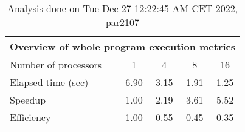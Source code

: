 \begin{table}[h]
\begin{center}
\begin{tabular}{|l|c|c|c|c|}
\hline
\multicolumn{5}{|c|}{Overview of whole program execution metrics} \\
\hline
\hline
Number of processors & 1 & 4 & 8 & 16 \\
\hline
Elapsed time (sec)      &       6.90 &       3.15 &       1.91 &       1.25 \\
\hline
Speedup                 &       1.00 &       2.19 &       3.61 &       5.52 \\
\hline
Efficiency              &       1.00 &       0.55 &       0.45 &       0.35 \\
\hline
\end{tabular}
\end{center}
\caption{ Analysis done on Tue Dec 27 12:22:45 AM CET 2022, par2107}
\end{table}
